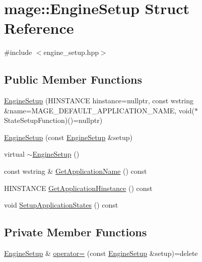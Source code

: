 \hypertarget{structmage_1_1_engine_setup}{}\section{mage\+:\+:Engine\+Setup Struct Reference}
\label{structmage_1_1_engine_setup}


{\ttfamily \#include $<$engine\+\_\+setup.\+hpp$>$}

\subsection*{Public Member Functions}
\begin{DoxyCompactItemize}
\item 
\hyperlink{structmage_1_1_engine_setup_a926d9b0e6aa2d1e57d0c2bc2ca46a885}{Engine\+Setup} (H\+I\+N\+S\+T\+A\+N\+CE hinstance=nullptr, const wstring \&name=M\+A\+G\+E\+\_\+\+D\+E\+F\+A\+U\+L\+T\+\_\+\+A\+P\+P\+L\+I\+C\+A\+T\+I\+O\+N\+\_\+\+N\+A\+ME, void($\ast$State\+Setup\+Function)()=nullptr)
\item 
\hyperlink{structmage_1_1_engine_setup_a2399c7966ed02ce9e9ab951b7483aac1}{Engine\+Setup} (const \hyperlink{structmage_1_1_engine_setup}{Engine\+Setup} \&setup)
\item 
virtual \hyperlink{structmage_1_1_engine_setup_a6a3a5afe40b976946699f69504b0a5e9}{$\sim$\+Engine\+Setup} ()
\item 
const wstring \& \hyperlink{structmage_1_1_engine_setup_a63fed5e978c020ebc9d5080fe6fcefdc}{Get\+Application\+Name} () const
\item 
H\+I\+N\+S\+T\+A\+N\+CE \hyperlink{structmage_1_1_engine_setup_a2d9220896adfe924ac72165b4e2b13cf}{Get\+Application\+Hinstance} () const
\item 
void \hyperlink{structmage_1_1_engine_setup_ab95385739022f00e811b924c9bc0c031}{Setup\+Application\+States} () const
\end{DoxyCompactItemize}
\subsection*{Private Member Functions}
\begin{DoxyCompactItemize}
\item 
\hyperlink{structmage_1_1_engine_setup}{Engine\+Setup} \& \hyperlink{structmage_1_1_engine_setup_ad7066882519b59ca533293f743334508}{operator=} (const \hyperlink{structmage_1_1_engine_setup}{Engine\+Setup} \&setup)=delete
\end{DoxyCompactItemize}
